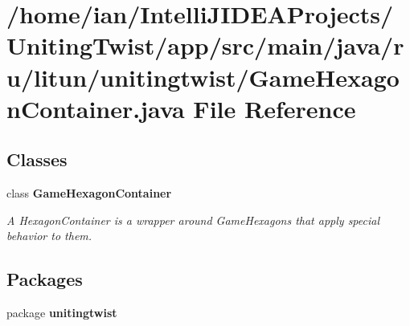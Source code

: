 \section{/home/ian/\+Intelli\+J\+I\+D\+E\+A\+Projects/\+Uniting\+Twist/app/src/main/java/ru/litun/unitingtwist/\+Game\+Hexagon\+Container.java File Reference}
\label{_game_hexagon_container_8java}
\subsection*{Classes}
\begin{DoxyCompactItemize}
\item 
class \textbf{ Game\+Hexagon\+Container}
\begin{DoxyCompactList}\small\item\em A Hexagon\+Container is a wrapper around Game\+Hexagons that apply special behavior to them. \end{DoxyCompactList}\end{DoxyCompactItemize}
\subsection*{Packages}
\begin{DoxyCompactItemize}
\item 
package \textbf{ unitingtwist}
\end{DoxyCompactItemize}
